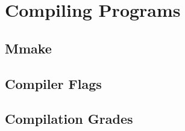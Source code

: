 \section{Compiling Programs}
\subsection{Mmake}
\subsection{Compiler Flags}
\subsection{Compilation Grades}



